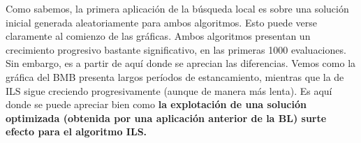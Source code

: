 \documentclass[10pt, a4paper]{article}
\theoremstyle{theorem-style}
\theoremstyle{theorem-style}
\theoremstyle{theorem2-style}
\theoremstyle{definition-style}
\theoremstyle{remark-style}
\theoremstyle{example-style}
\theoremstyle{definition-style}
\theoremstyle{remark-style}
\theoremstyle{remark-style}
\begin{document}
Como sabemos, la primera aplicación de la búsqueda local es sobre una solución inicial generada aleatoriamente para ambos algoritmos. Esto puede verse claramente al comienzo de las gráficas. Ambos algoritmos presentan un crecimiento progresivo bastante significativo, en las primeras 1000 evaluaciones. Sin embargo, es a partir de aquí donde se aprecian las diferencias. Vemos como la gráfica del BMB presenta largos períodos de estancamiento, mientras que la de ILS sigue creciendo progresivamente (aunque de manera más lenta). Es aquí donde se puede apreciar bien como \textbf{la explotación de una solución optimizada (obtenida por una aplicación anterior de la BL) surte efecto para el algoritmo ILS. }
\end{document}
